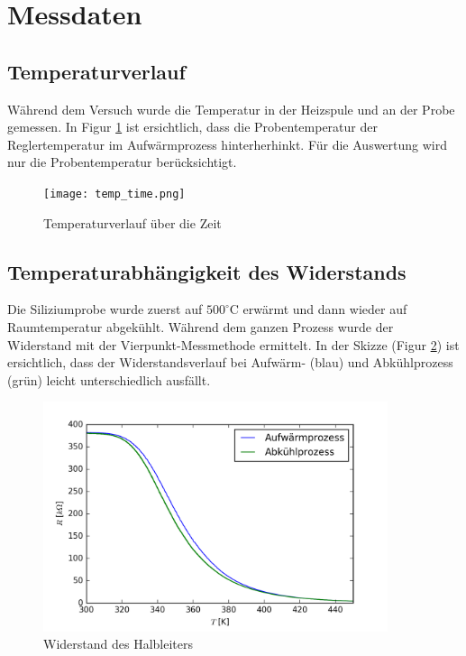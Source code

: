 \documentclass[a4paper]{scrartcl}
\begin{document}
\section{Messdaten}

\subsection{Temperaturverlauf}
Während dem Versuch wurde die Temperatur in der Heizspule und an der Probe gemessen. In Figur \ref{temp_time} ist ersichtlich, dass die Probentemperatur der Reglertemperatur im Aufwärmprozess hinterherhinkt. Für die Auswertung wird nur die Probentemperatur berücksichtigt.
%
\begin{figure}[htbp]
\centering
\texttt{[image: temp\_time.png]}
\caption{Temperaturverlauf über die Zeit}
\label{temp_time}
\end{figure}
%

\subsection{Temperaturabhängigkeit des Widerstands}
Die Siliziumprobe wurde zuerst auf $500^{\circ}$C erwärmt und dann wieder auf Raumtemperatur abgekühlt. Während dem ganzen Prozess wurde der Widerstand mit der Vierpunkt-Messmethode ermittelt. In der Skizze (Figur \ref{res_temp}) ist ersichtlich, dass der Widerstandsverlauf bei Aufwärm- (blau) und Abkühlprozess (grün) leicht unterschiedlich ausfällt.
%
\begin{figure}[htbp]
\centering
\includegraphics[width=0.9\textwidth]{res_temp.png}
\caption{Widerstand des Halbleiters}
\label{res_temp}
\end{figure}
%

\newpage
\end{document}
